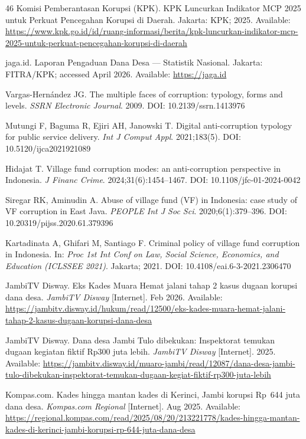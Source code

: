 \documentclass[3p,times,procedia]{elsarticle}
\begin{document}
\begin{thebibliography}{46}
Komisi Pemberantasan Korupsi (KPK). KPK Luncurkan Indikator MCP 2025 untuk Perkuat Pencegahan Korupsi di Daerah. Jakarta: KPK; 2025. Available: \url{https://www.kpk.go.id/id/ruang-informasi/berita/kpk-luncurkan-indikator-mcp-2025-untuk-perkuat-pencegahan-korupsi-di-daerah}

jaga.id. Laporan Pengaduan Dana Desa --- Statistik Nasional. Jakarta: FITRA/KPK; accessed April 2026. Available: \url{https://jaga.id}

Vargas-Hernández JG. The multiple faces of corruption: typology, forms and levels. \textit{SSRN Electronic Journal}. 2009. DOI: 10.2139/ssrn.1413976

Mutungi F, Baguma R, Ejiri AH, Janowski T. Digital anti-corruption typology for public service delivery. \textit{Int J Comput Appl}. 2021;183(5). DOI: 10.5120/ijca2021921089

Hidajat T. Village fund corruption modes: an anti-corruption perspective in Indonesia. \textit{J Financ Crime}. 2024;31(6):1454--1467. DOI: 10.1108/jfc-01-2024-0042

Siregar RK, Aminudin A. Abuse of village fund (VF) in Indonesia: case study of VF corruption in East Java. \textit{PEOPLE Int J Soc Sci}. 2020;6(1):379--396. DOI: 10.20319/pijss.2020.61.379396

Kartadinata A, Ghifari M, Santiago F. Criminal policy of village fund corruption in Indonesia. In: \textit{Proc 1st Int Conf on Law, Social Science, Economics, and Education (ICLSSEE 2021)}. Jakarta; 2021. DOI: 10.4108/eai.6-3-2021.2306470

JambiTV Disway. Eks Kades Muara Hemat jalani tahap 2 kasus dugaan korupsi dana desa. \textit{JambiTV Disway} [Internet]. Feb 2026. Available: \url{https://jambitv.disway.id/hukum/read/12500/eks-kades-muara-hemat-jalani-tahap-2-kasus-dugaan-korupsi-dana-desa}

JambiTV Disway. Dana desa Jambi Tulo dibekukan: Inspektorat temukan dugaan kegiatan fiktif Rp300 juta lebih. \textit{JambiTV Disway} [Internet]. 2025. Available: \url{https://jambitv.disway.id/muaro-jambi/read/12087/dana-desa-jambi-tulo-dibekukan-inspektorat-temukan-dugaan-kegiat-fiktif-rp300-juta-lebih}

Kompas.com. Kades hingga mantan kades di Kerinci, Jambi korupsi Rp~644 juta dana desa. \textit{Kompas.com Regional} [Internet]. Aug 2025. Available: \url{https://regional.kompas.com/read/2025/08/20/213221778/kades-hingga-mantan-kades-di-kerinci-jambi-korupsi-rp-644-juta-dana-desa}


\end{thebibliography}
\end{document}
